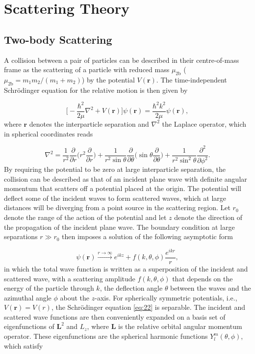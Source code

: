 \chapter{Scattering Theory}\label{chap:3}
\section{Two-body Scattering} \label{Two-body scattering}
A collision between a pair of particles can be described in their centre-of-mass frame as the scattering of a particle with reduced mass $\mu_{2\mathrm{b}}$ ($\mu_{2\mathrm{b}} = m_1m_2/(m_1 + m_2)$) by the potential $V(\mathbf{r})$. The time-independent  Schr{\"o}dinger equation for the relative motion is then given by 

\begin{equation} \label{eq:22}
\bigg[-\frac{\hbar^2}{2\mu}\nabla^2 + V(\mathbf{r})\bigg]\psi(\mathbf{r}) = \frac{\hbar^2 k^2}{2 \mu}\psi(\mathbf{r}),
\end{equation}
where $\mathbf{r}$ denotes the interparticle separation and $\nabla^2$ the Laplace operator, which in spherical coordinates reads

\begin{equation} \label{eq:23}
\nabla^2 = \frac{1}{r^2} \frac{\partial}{\partial r} \bigg(r^2 \frac{\partial}{\partial r}\bigg) + \frac{1}{r^2 \sin\theta} \frac{\partial}{\partial\theta} \bigg(\sin\theta \frac{\partial}{\partial\theta}\bigg) + \frac{1}{r^2 \sin^2\theta} \frac{\partial^2}{\partial\phi^2}.
\end{equation}
By requiring the potential to be zero at large interparticle separation, the collision can be described as that of an incident plane wave with definite angular momentum that scatters off a potential placed at the origin. The potential will deflect some of the incident waves to form scattered waves, which at large distances will be diverging from a point source in the scattering region. Let $r_0$ denote the range of the action of the potential and let $z$ denote the direction of the propagation of the incident plane wave. The boundary condition at large separations $r \gg r_0$ then imposes a solution of the following asymptotic form

\begin{equation}\label{eq:26}
\psi(\mathbf{r}) \xrightarrow{r \to \infty} e^{ikz} + f(k,\theta,\phi)\frac{e^{ikr}}{r},
\end{equation}
in which the total wave function is written as a superposition of the incident and scattered wave, with a scattering amplitude $f(k,\theta,\phi)$ that depends on the energy of the particle through $k$, the deflection angle $\theta$ between the waves and the azimuthal angle $\phi$ about the $z$-axis. For spherically symmetric potentials, i.e., $V(\mathbf{r}) = V(r)$, the Schr{\"o}dinger equation \eqref{eq:22} is separable. The incident and scattered wave functions are then conveniently expanded on a basis set of eigenfunctions of $\mathbf{L}^2$ and $L_z$, where $\mathbf{L}$ is the relative orbital angular momentum operator. These eigenfunctions are the spherical harmonic functions $Y_l^m(\theta,\phi)$, which satisfy 


